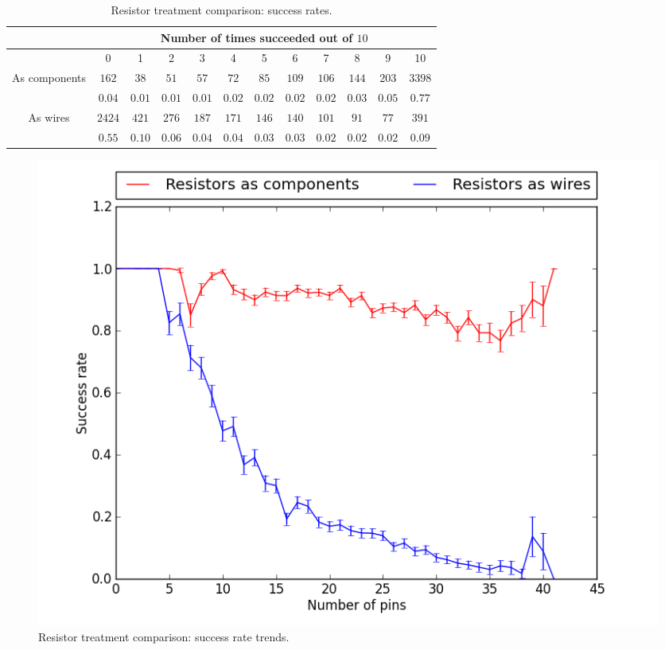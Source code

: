 \begin{table}[H]
\begin{center}
\begin{singlespace}
\begin{tabular}{|c||c|c|c|c|c|c|c|c|c|c|c|}
\hline
 & \multicolumn{11}{|c|}{Number of times succeeded out of $10$} \\
\hline
 & 0 & 1 & 2 & 3 & 4 & 5 & 6 & 7 & 8 & 9 & 10 \\
\hline\hline
As components & $162$ & $38$ & $51$ & $57$ & $72$ & $85$ & $109$ & $106$ & $144$ & $203$ & $3398$ \\
 & $0.04$ & $0.01$ & $0.01$ & $0.01$ & $0.02$ & $0.02$ & $0.02$ & $0.02$ & $0.03$ & $0.05$ & $0.77$ \\
\hline
 As wires & $2424$ & $421$ & $276$ & $187$ & $171$ & $146$ & $140$ & $101$ & $91$ & $77$ & $391$ \\
  & $0.55$ & $0.10$ & $0.06$ & $0.04$ & $0.04$ & $0.03$ & $0.03$ & $0.02$ & $0.02$ & $0.02$ & $0.09$ \\
\hline
\end{tabular}
\end{singlespace}
\end{center}
\label{tb:resistor_success}
\caption{Resistor treatment comparison: success rates.}
\end{table}

\begin{figure}[H]
\begin{center}
\includegraphics[width=\textwidth]{Images/resistor_success_trend_comparison.png}
\caption{Resistor treatment comparison: success rate trends.}
\label{fig:resistor_success_trend}
\end{center}
\end{figure}

